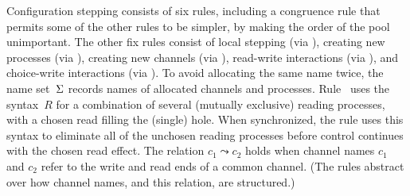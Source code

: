 Configuration stepping consists of six rules, including a congruence
rule  that permits some of the other rules to be simpler,
by making the order of the pool unimportant.
%
The other fix rules consist of local stepping (via ),
creating new processes (via ),
creating new channels (via ),
read-write interactions (via ),
and choice-write interactions (via ).
%
To avoid allocating the same name twice, 
the name set~$\Sigma$ records names of allocated channels and processes.
%
Rule~ uses the syntax~$R$ for a combination of several (mutually exclusive) 
reading processes, with a chosen read filling the (single) hole. 
%
When synchronized, 
the rule uses this syntax to eliminate all of the unchosen reading processes 
before control continues with the chosen read effect.
%
The relation $c_1 \leadsto c_2$ holds when 
channel names $c_1$ and $c_2$ refer to the 
write and read ends of a common channel.
%
(The rules abstract over how channel names, and this relation, are structured.)


